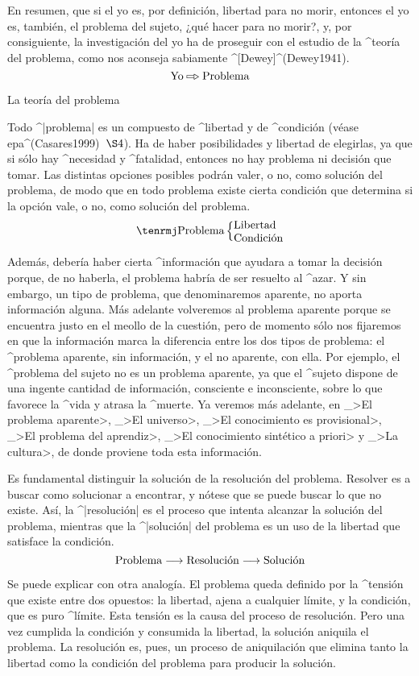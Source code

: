 En resumen, que si el yo es, por definición, libertad para no morir,
entonces el yo es, también, el problema del sujeto, ¿qué hacer para no
morir?, y, por consiguiente, la investigación del yo ha de proseguir con
el estudio de la ^{teoría del problema}, como nos aconseja sabiamente
^[Dewey]^(Dewey1941).
$$\hbox{Yo} \etapa \hbox{Problema}$$


\Section La teoría del problema

Todo ^|problema| es un compuesto de ^{libertad} y de ^{condición} (véase
{\sc epa}^(Casares1999)~$\S4$). Ha de haber posibilidades y libertad de
elegirlas, ya que si sólo hay ^{necesidad} y ^{fatalidad}, entonces no
hay problema ni decisión que tomar. Las distintas opciones posibles
podrán valer, o no, como solución del problema, de modo que en todo
problema existe cierta condición que determina si la opción vale, o no,
como solución del problema.
$$
\centerline{$\hbox{\rm Problema}
 \left\lbrace\vcenter{\hbox{Libertad}\hbox{Condición}}\right.$}
$$

Además, debería haber cierta ^{información} que ayudara a tomar la
decisión porque, de no haberla, el problema habría de ser resuelto al
^{azar}. Y sin embargo, un tipo de problema, que denominaremos aparente,
no aporta información alguna. Más adelante volveremos al problema
aparente porque se encuentra justo en el meollo de la cuestión, pero de
momento sólo nos fijaremos en que la información marca la diferencia
entre los dos tipos de problema: el ^{problema aparente}, sin
información, y el no aparente, con ella. Por ejemplo, el ^{problema del
sujeto} no es un problema aparente, ya que el ^{sujeto} dispone de una
ingente cantidad de información, consciente e inconsciente, sobre lo que
favorece la ^{vida} y atrasa la ^{muerte}. Ya veremos más adelante, en
_>El problema aparente>, _>El universo>, _>El conocimiento es
provisional>, _>El problema del aprendiz>, _>El conocimiento sintético a
priori> y _>La cultura>, de donde proviene toda esta información.

Es fundamental distinguir la solución de la resolución del problema.
Resolver es a buscar como solucionar a encontrar, y nótese que se puede
buscar lo que no existe. Así, la ^|resolución| es el proceso que intenta
alcanzar la solución del problema, mientras que la ^|solución| del
problema es un uso de la libertad que satisface la condición.
$$ \hbox{Problema} \longrightarrow
 \hbox{Resolución} \longrightarrow \hbox{Solución}$$

Se puede explicar con otra analogía. El problema queda definido por la
^{tensión} que existe entre dos opuestos: la libertad, ajena a cualquier
límite, y la condición, que es puro ^{límite}. Esta tensión es la causa
del proceso de resolución. Pero una vez cumplida la condición y
consumida la libertad, la solución aniquila el problema. La resolución
es, pues, un proceso de aniquilación que elimina tanto la libertad como
la condición del problema para producir la solución.

